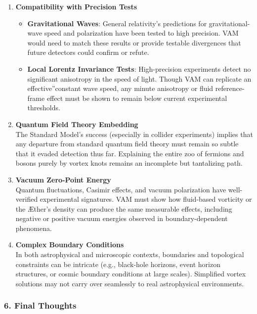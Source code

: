 \documentclass[a4paper,12pt]{article}
\begin{document}
\begin{enumerate}
    \item \textbf{Compatibility with Precision Tests}
    \begin{itemize}
        \item \textbf{Gravitational Waves}: General relativity's predictions for gravitational-wave speed and polarization have been tested to high precision. VAM would need to match these results or provide testable divergences that future detectors could confirm or refute.
        \item \textbf{Local Lorentz Invariance Tests}: High-precision experiments detect no significant anisotropy in the speed of light. Though VAM can replicate an \grqq effective\textquotedblright constant wave speed, any minute anisotropy or fluid reference-frame effect must be shown to remain below current experimental thresholds.
    \end{itemize}

    \item \textbf{Quantum Field Theory Embedding} \\
    The Standard Model's success (especially in collider experiments) implies that any departure from standard quantum field theory must remain so subtle that it evaded detection thus far. Explaining the entire zoo of fermions and bosons purely by vortex knots remains an incomplete but tantalizing path.

    \item \textbf{Vacuum Zero-Point Energy} \\
    Quantum fluctuations, Casimir effects, and vacuum polarization have well-verified experimental signatures. VAM must show how fluid-based vorticity or the Æther's density can produce the same measurable effects, including negative or positive vacuum energies observed in boundary-dependent phenomena.

    \item \textbf{Complex Boundary Conditions} \\
    In both astrophysical and microscopic contexts, boundaries and topological constraints can be intricate (e.g., black-hole horizons, event horizon structures, or cosmic boundary conditions at large scales). Simplified vortex solutions may not carry over seamlessly to real astrophysical environments.
\end{enumerate}

\subsubsection*{6. Final Thoughts}
\end{document}
